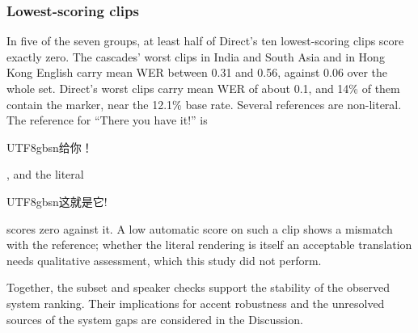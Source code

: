 \subsubsection{Lowest-scoring clips}
In five of the seven groups, at least half of Direct's ten lowest-scoring clips score exactly zero. The cascades' worst clips in India and South Asia and in Hong Kong English carry mean WER between 0.31 and 0.56, against 0.06 over the whole set. Direct's worst clips carry mean WER of about 0.1, and 14\% of them contain the marker, near the 12.1\% base rate. Several references are non-literal. The reference for ``There you have it!'' is \begin{CJK*}{UTF8}{gbsn}给你！\end{CJK*}, and the literal \begin{CJK*}{UTF8}{gbsn}这就是它!\end{CJK*} scores zero against it. A low automatic score on such a clip shows a mismatch with the reference; whether the literal rendering is itself an acceptable translation needs qualitative assessment, which this study did not perform.

Together, the subset and speaker checks support the stability of the observed
system ranking. Their implications for accent robustness and the unresolved
sources of the system gaps are considered in the Discussion.
